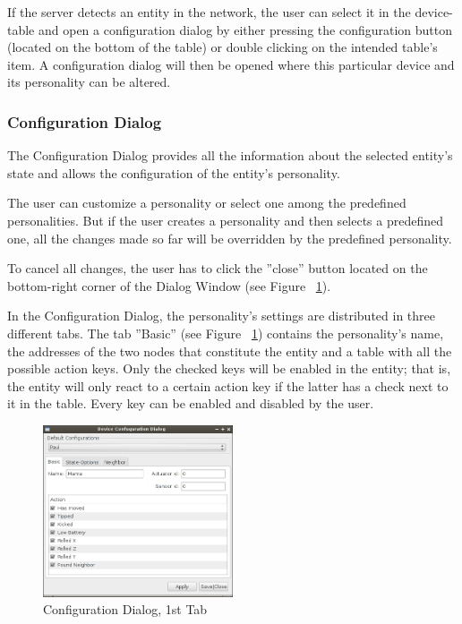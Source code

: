 If the server detects an entity in the network, the user can select it in the device-table and open a configuration dialog by either pressing the configuration button (located on the bottom of the table) or double clicking on the intended table's item. A configuration dialog will then be opened where this particular device and its personality can be altered.

\subsubsection{Configuration Dialog}

The Configuration Dialog provides all the information about the selected entity's state and allows the configuration of the entity's personality. 

The user can customize a personality or select one among the predefined personalities. But if the user creates a personality and then selects a predefined one, all the changes made so far will be overridden by the predefined personality. 

To cancel all changes, the user has to click the ''close'' button located on the bottom-right corner of the Dialog Window (see Figure ~\ref{fig:java-server-config01}).   

In the Configuration Dialog, the personality's settings are distributed in three different tabs. The tab ''Basic'' (see Figure ~\ref{fig:java-server-config01}) contains the personality's name, the addresses of the two nodes that constitute the entity and a table with all the possible action keys. Only the checked keys will be enabled in the entity; that is, the entity will only react to a certain action key if the latter has a check next to it in the table. Every key can be enabled and disabled by the user. 


\begin{figure}[h!]
 \centering
 \includegraphics[width= 0.5\textwidth, clip=true  ,keepaspectratio=true]{./pic/java-server-config01.png}
 \caption{Configuration Dialog, 1st Tab}
 \label{fig:java-server-config01}
\end{figure}

